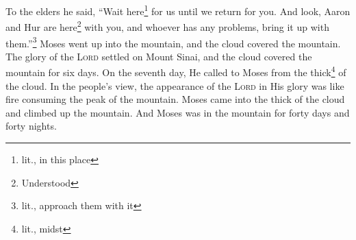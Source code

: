 \begin{enumerate*}[mode=unboxed]
     To the elders he said, ``Wait here\footnote{lit., in this place} for us until we return for you. And look, Aaron and Hur are here\footnote{Understood} with you, and whoever has any problems, bring it up with them.''\footnote{lit., approach them with it}%
     Moses went up into the mountain, and the cloud covered the mountain.%
     The glory of the \textsc{Lord} settled on Mount Sinai, and the cloud covered the mountain for six days. On the seventh day, He called to Moses from the thick\footnote{lit., midst} of the cloud.%
     In the people's view, the appearance of the \textsc{Lord} in His glory was like fire consuming the peak of the mountain.%
     Moses came into the thick of the cloud and climbed up the mountain. And Moses was in the mountain for forty days and forty nights.%
\end{enumerate*}
